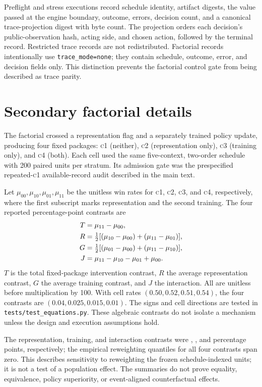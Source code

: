 \documentclass[aps,reprint,superscriptaddress,longbibliography,floatfix]{revtex4-2}
\newcommand{\pp}{percentage points}
\newcommand{\COne}{\textsc{c1}}
\newcommand{\CTwo}{\textsc{c2}}
\newcommand{\CThree}{\textsc{c3}}
\newcommand{\CFour}{\textsc{c4}}
\begin{document}
Preflight and stress executions record schedule identity, artifact digests,
the value passed at the engine boundary, outcome, errors, decision count, and a
canonical trace-projection digest with byte count.  The projection orders each
decision's public-observation hash, acting side, and chosen action, followed by
the terminal record.  Restricted trace records are not redistributed.
Factorial records intentionally use
\texttt{trace\_mode=none}; they contain schedule, outcome, error, and decision
fields only.  This distinction prevents the factorial control gate from being
described as trace parity.

\section{Secondary factorial details}

The factorial crossed a representation flag and a separately trained policy
update, producing four fixed packages: \COne{} (neither), \CTwo{}
(representation only), \CThree{} (training only), and \CFour{} (both).  Each
cell used the same five-context, two-order schedule with 200 paired units per
stratum.  Its admission gate was the prespecified repeated-\COne{}
available-record audit described in the main text.

Let $\mu_{00},\mu_{10},\mu_{01},\mu_{11}$ be the unitless win rates for
\COne{}, \CTwo{}, \CThree{}, and \CFour{}, respectively, where the first
subscript marks representation and the second training.  The four reported
percentage-point contrasts are
\begin{align}
 T &= \mu_{11}-\mu_{00}, \notag\\
 R &= \tfrac12[(\mu_{10}-\mu_{00})+(\mu_{11}-\mu_{01})], \notag\\
 G &= \tfrac12[(\mu_{01}-\mu_{00})+(\mu_{11}-\mu_{10})], \notag\\
 J &= \mu_{11}-\mu_{10}-\mu_{01}+\mu_{00}.
 \label{eq:factorial}
\end{align}
$T$ is the total fixed-package intervention contrast, $R$ the average
representation contrast, $G$ the average training contrast, and $J$ the
interaction.  All are unitless before multiplication by 100.  With cell rates
$(0.50,0.52,0.51,0.54)$, the four contrasts are $(0.04,0.025,0.015,0.01)$.
The signs and cell directions are tested in
\texttt{tests/test\_equations.py}.  These algebraic contrasts do not isolate a
mechanism unless the design and execution assumptions hold.

The representation, training, and interaction contrasts were
\RepresentationEstimatePP{}, \TrainingEstimatePP{}, and
\InteractionEstimatePP{} \pp{}, respectively; the empirical reweighting
quantiles for all four contrasts span zero.  This describes sensitivity to
reweighting the frozen schedule-indexed units; it is not a test of a population
effect.  The summaries do not prove equality, equivalence, policy superiority,
or event-aligned counterfactual effects.
\end{document}
